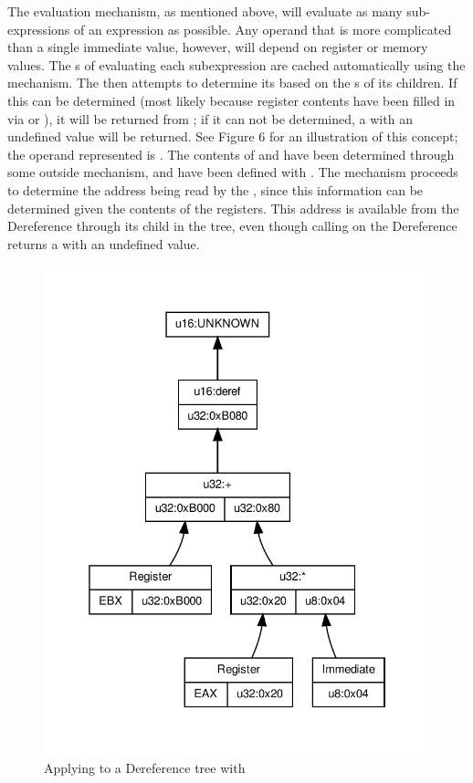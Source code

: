 The evaluation mechanism, as mentioned above, will evaluate as many
sub-\/expressions of an expression as possible. Any operand that is more
complicated than a single immediate value, however, will depend on register or
memory values. The s of evaluating each subexpression are cached
automatically using the  mechanism. The  then attempts
to determine its  based on the s of its children. If this  can
be determined (most likely because register contents have been filled in via
 or ), it will be returned from ; if it can
not be determined, a  with an undefined value will be returned. See Figure
6 for an illustration of this concept; the operand represented is 
. 
The contents of  and  have been determined through some
outside mechanism, and have been defined with . The 
mechanism proceeds to determine the address being read by the , since
this information can be determined given the contents of the registers. This
address is available from the Dereference through its child in the tree, even
though calling  on the Dereference returns a  with an
undefined value. 

\begin{figure}
    \centering
\includegraphics{fig/deref-eval}
\caption{Applying  to a Dereference tree with}
\label{fig:deref-eval}
\end{figure}

